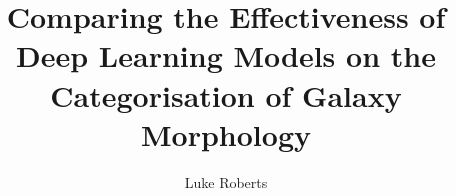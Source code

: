 \documentclass[runningheads]{llncs}
\begin{document}
\title{Comparing the Effectiveness of Deep Learning Models on the Categorisation of Galaxy Morphology}
\author{Luke Roberts}
\maketitle
\end{document}
